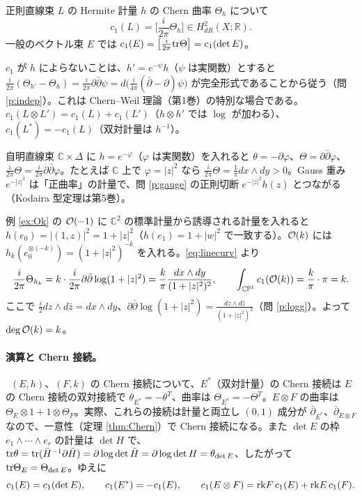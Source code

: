 \begin{defn}[第1 Chern 類]
正則直線束 $L$ の Hermite 計量 $h$ の Chern 曲率 $\Theta_h$ について
\[
c_1(L)=\Big[\frac i{2\pi}\Theta_h\Big]\in H^2_{dR}(X;\mathbb R).
\]
一般のベクトル束 $E$ では $c_1(E)=\big[\frac i{2\pi}\mathrm{tr}\Theta\big]=c_1(\det E)$。
\end{defn}
$c_1$ が $h$ によらないことは、$h'=e^{-\psi}h$（$\psi$ は実関数）とすると $\frac i{2\pi}(\Theta_{h'}-\Theta_h)=\frac i{2\pi}\partial\bar\partial\psi=d\big(\tfrac i{4\pi}(\bar\partial-\partial)\psi\big)$ が完全形式であることから従う（問 \ref{p:indep}）。これは Chern--Weil 理論（第1巻）の特別な場合である。$c_1(L\otimes L')=c_1(L)+c_1(L')$（$h\otimes h'$ では $\log$ が加わる）、$c_1(L^*)=-c_1(L)$（双対計量は $h^{-1}$）。

\begin{ex}[自明束と重み関数]
自明直線束 $\mathbb C\times\Delta$ に $h=e^{-\varphi}$（$\varphi$ は実関数）を入れると $\theta=-\partial\varphi$、$\Theta=\partial\bar\partial\varphi$、$\frac i{2\pi}\Theta=\frac i{2\pi}\partial\bar\partial\varphi$。たとえば $\mathbb C$ 上で $\varphi=|z|^2$ なら $\frac i{2\pi}\Theta=\frac1\pi dx\wedge dy>0$。Gauss 重み $e^{-|z|^2}$ は「正曲率」の計量で、問 \ref{p:gauge} の正則切断 $e^{-|z|^2}h(z)$ とつながる（Kodaira 型定理は第5巻）。
\end{ex}

\begin{ex}\label{ex:degk}\tP
例 \ref{ex:Ok} の $\mathcal O(-1)$ に $\mathbb C^2$ の標準計量から誘導される計量を入れると $h(e_0)=|(1,z)|^2=1+|z|^2$（$h(e_1)=1+|w|^2$ で一致する）。$\mathcal O(k)$ には $h_k(e_0^{\otimes(-k)})=(1+|z|^2)^{-k}$ を入れる。\eqref{eq:linecurv} より
\[
\frac i{2\pi}\Theta_{h_k}=k\cdot\frac i{2\pi}\partial\bar\partial\log(1+|z|^2)=\frac{k}{\pi}\frac{dx\wedge dy}{(1+|z|^2)^2},\qquad\int_{\mathbb{CP}^1}c_1(\mathcal O(k))=\frac k\pi\cdot\pi=k .
\]
ここで $\frac i2dz\wedge d\bar z=dx\wedge dy$、$\partial\bar\partial\log(1+|z|^2)=\frac{dz\wedge d\bar z}{(1+|z|^2)^2}$（問 \ref{p:logg}）。よって $\deg\mathcal O(k)=k$。
\end{ex}


\paragraph{演算と Chern 接続。}\tP\ $(E,h)$、$(F,k)$ の Chern 接続について、$E^*$（双対計量）の Chern 接続は $E$ の Chern 接続の双対接続で $\theta_{E^*}=-\theta^T$、曲率は $\Theta_{E^*}=-\Theta^T$。$E\otimes F$ の曲率は $\Theta_E\otimes1+1\otimes\Theta_F$。実際、これらの接続は計量と両立し $(0,1)$ 成分が $\bar\partial_{E^*}$、$\bar\partial_{E\otimes F}$ なので、一意性（定理 \ref{thm:Chern}）で Chern 接続になる。また $\det E$ の枠 $e_1\wedge\cdots\wedge e_r$ の計量は $\det H$ で、$\mathrm{tr}\theta=\mathrm{tr}(\bar H^{-1}\partial\bar H)=\partial\log\det\bar H=\partial\log\det H=\theta_{\det E}$、したがって $\mathrm{tr}\Theta_E=\Theta_{\det E}$。ゆえに
\[
c_1(E)=c_1(\det E),\qquad c_1(E^*)=-c_1(E),\qquad c_1(E\otimes F)=\mathrm{rk} F\,c_1(E)+\mathrm{rk} E\,c_1(F).
\]

